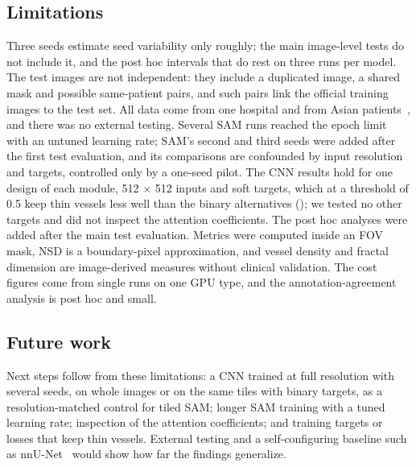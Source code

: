 \subsection*{Limitations}
Three seeds estimate seed variability only roughly; the main image-level tests do not include it, and the post hoc
intervals that do rest on three runs per model. The test images are not independent: they include a duplicated image, a
shared mask and possible same-patient pairs, and \NIsoWithTest{} such pairs link the official training images to the test
set. All data come from one hospital and from Asian patients~\cite{jin2022fives}, and there was no external testing.
Several SAM runs reached the epoch limit with an untuned learning rate; SAM's second and third seeds were added after the
first test evaluation, and its comparisons are confounded by input resolution and targets, controlled only by a one-seed
pilot. The CNN results hold for one design of each module, 512
$\times$ 512 inputs and soft targets, which at a threshold of 0.5 keep thin vessels less well than the binary
alternatives (); we tested no other targets and did not inspect the attention coefficients.
The post hoc analyses were added after the main test evaluation. Metrics were computed inside an FOV mask, NSD is a boundary-pixel approximation, and vessel
density and fractal dimension are image-derived measures without clinical validation. The cost figures come from single
runs on one GPU type, and the annotation-agreement analysis is post hoc and small.

\subsection*{Future work}
Next steps follow from these limitations: a CNN trained at full resolution with several seeds, on whole images or on the
same tiles with binary targets, as a resolution-matched control for tiled SAM; longer SAM training with a tuned learning
rate; inspection of the attention coefficients; and training targets or losses that keep thin vessels. External testing
and a self-configuring baseline such as nnU-Net~\cite{isensee2021nnunet} would show how far the findings generalize.
